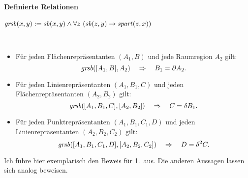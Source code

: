 
\paragraph{Definierte Relationen}

    \begin{erin}
        $\Ggrsb(x,y) := \Gsb(x,y) \wedge \forall z\ (\Gsb(z,y) \to \Gspart(z,x))$
    \end{erin}

    \begin{hyp}[$\Ggrsb$]\ \vspace{0pt} 

        \begin{itemize}
            \item Für jeden Flächenrepräsentanten $(A_1,B)$ und jede Raumregion $A_2$ gilt:
                $$\mathit{gr\hspace*{-0.25ex}sb}([A_1,B],A_2) \quad \Rightarrow \quad B_1 = \partial A_2.$$
            \item Für jeden Linienrepräsentanten $(A_1,B_1,C)$ und jeden Flächenrepräsentanten $(A_2,B_2)$ gilt:
                $$\mathit{gr\hspace*{-0.25ex}sb}([A_1,B_1,C],[A_2,B_2]) \quad \Rightarrow \quad C = \delta B_1.$$
            \item Für jeden Punktrepräsentanten $(A_1,B_1,C_1,D)$ und jeden Linienrepräsentanten $(A_2,B_2,C_2)$ gilt:
                $$\mathit{gr\hspace*{-0.25ex}sb}([A_1,B_1,C_1,D],[A_2,B_2,C_2]) \quad \Rightarrow \quad D = \delta^2 C.$$
        \end{itemize}

    \end{hyp}
    
    Ich führe hier exemplarisch den Beweis für 1.\ aus. 
    Die anderen Aussagen lassen sich analog beweisen.
    
